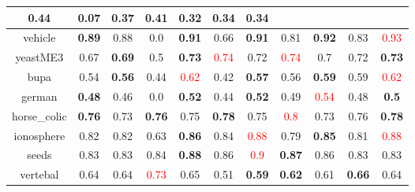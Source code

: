 \documentclass{article}%
\begin{document}
\begin{tabular}{c|cccccccccc}
{0.44
}&0.07&\textbf{0.37}&\textbf{0.41}&0.32&0.34&0.34\\%
\hline%
vehicle&\textbf{0.89}&0.88&0.0&\textbf{0.91}&0.66&\textbf{0.91}&0.81&\textbf{0.92}&0.83&\textcolor{red}{ 
0.93
}\\%
\hline%
yeastME3&0.67&\textbf{0.69}&0.5&\textbf{0.73}&\textcolor{red}{ 
0.74
}&0.72&\textcolor{red}{ 
0.74
}&0.7&0.72&\textbf{0.73}\\%
\hline%
bupa&0.54&\textbf{0.56}&0.44&\textcolor{red}{ 
0.62
}&0.42&\textbf{0.57}&0.56&\textbf{0.59}&0.59&\textcolor{red}{ 
0.62
}\\%
\hline%
german&\textbf{0.48}&0.46&0.0&\textbf{0.52}&0.44&\textbf{0.52}&0.49&\textcolor{red}{ 
0.54
}&0.48&\textbf{0.5}\\%
\hline%
horse\_colic&\textbf{0.76}&0.73&\textbf{0.76}&0.75&\textbf{0.78}&0.75&\textcolor{red}{ 
0.8
}&0.73&0.76&\textbf{0.78}\\%
\hline%
ionosphere&0.82&0.82&0.63&\textbf{0.86}&0.84&\textcolor{red}{ 
0.88
}&0.79&\textbf{0.85}&0.81&\textcolor{red}{ 
0.88
}\\%
\hline%
seeds&0.83&0.83&0.84&\textbf{0.88}&0.86&\textcolor{red}{ 
0.9
}&\textbf{0.87}&0.86&0.83&0.83\\%
\hline%
vertebal&0.64&0.64&\textcolor{red}{ 
0.73
}&0.65&0.51&\textbf{0.59}&\textbf{0.62}&0.61&\textbf{0.66}&0.64\\%
\hline%
\end{tabular}

%
\end{document}
